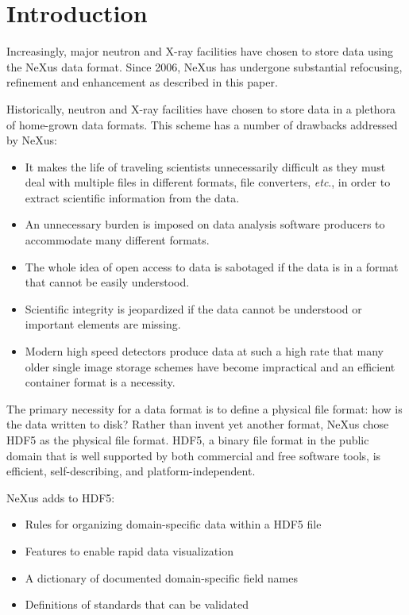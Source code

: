 \documentclass[%
 aip,
rsi,
 amsmath,amssymb,
 reprint,%
]{revtex4-1}
\begin{document}
\maketitle


\section{Introduction}
Increasingly, major neutron and X-ray facilities have chosen to store data using the NeXus data format\cite{nxold,Klosowski:1997fk}. 
Since 2006, NeXus has undergone substantial refocusing, 
refinement and enhancement as described in this paper.  

Historically, neutron and X-ray facilities have chosen to store data in a plethora of 
home-grown data formats. This scheme has a number of drawbacks addressed by NeXus: 
\begin{itemize}
\item It makes the life of traveling scientists unnecessarily difficult as they must deal with multiple files 
 in different formats, file converters, \emph{etc}., in order to extract scientific information from the data.
 \item An unnecessary burden is imposed on data analysis software producers to accommodate many different formats.  
\item The whole idea of open access to data is sabotaged if the data is in a format that cannot be easily understood.
\item Scientific integrity is jeopardized if the data cannot be understood or important elements are missing.
\item Modern high speed detectors produce data at such a high rate that many older single image storage schemes 
 have become impractical and 
 an efficient container format is a necessity. 
\end{itemize}

The primary necessity for a data format is to define a physical file format: how is the data written to disk? Rather than invent
yet another format, NeXus chose HDF5\cite{hdf5} as the physical file format. 
HDF5, a binary file format in the public domain that is well supported by both commercial and free software tools, 
is efficient, self-describing, and platform-independent.

NeXus adds to HDF5:
\begin{itemize}
\item Rules for organizing domain-specific data within a HDF5 file
\item Features to enable rapid data visualization
\item A dictionary of documented domain-specific field names
\item Definitions of standards that can be validated
\end{itemize}
\end{document}
